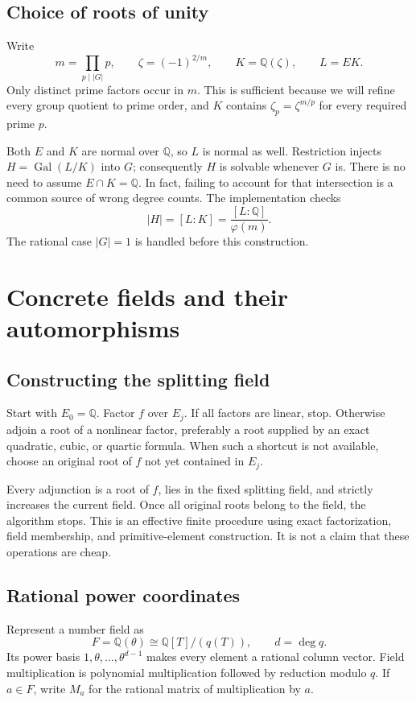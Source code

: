 \documentclass[11pt,a4paper]{article}
\theoremstyle{definition}\newtheorem{definition}[theorem]{Definition}
\theoremstyle{remark}\newtheorem{remark}[theorem]{Remark}
\newcommand{\Q}{\mathbb Q}\newcommand{\C}{\mathbb C}
\newcommand{\Gal}{\operatorname{Gal}}\newcommand{\Aut}{\operatorname{Aut}}
\begin{document}
\subsection{Choice of roots of unity}
Write
\[
 m=\prod_{p\mid |G|}p,\qquad \zeta=(-1)^{2/m},\qquad
 K=\Q(\zeta),\qquad L=EK.
\]
Only distinct prime factors occur in $m$. This is sufficient because we will
refine every group quotient to prime order, and $K$ contains
$\zeta_p=\zeta^{m/p}$ for every required prime $p$.

Both $E$ and $K$ are normal over $\Q$, so $L$ is normal as well. Restriction
injects $H=\Gal(L/K)$ into $G$; consequently $H$ is solvable whenever $G$ is.
There is no need to assume $E\cap K=\Q$. In fact, failing to account for that
intersection is a common source of wrong degree counts. The implementation
checks
\[
 |H|=[L:K]=\frac{[L:\Q]}{\varphi(m)}.
\]
The rational case $|G|=1$ is handled before this construction.

\section{Concrete fields and their automorphisms}
\subsection{Constructing the splitting field}
Start with $E_0=\Q$. Factor $f$ over $E_j$. If all factors are linear, stop.
Otherwise adjoin a root of a nonlinear factor, preferably a root supplied by
an exact quadratic, cubic, or quartic formula. When such a shortcut is not
available, choose an original root of $f$ not yet contained in $E_j$.

Every adjunction is a root of $f$, lies in the fixed splitting field, and
strictly increases the current field. Once all original roots belong to the
field, the algorithm stops. This is an effective finite procedure using
exact factorization, field membership, and primitive-element construction.
It is not a claim that these operations are cheap.

\subsection{Rational power coordinates}
Represent a number field as
\[
 F=\Q(\theta)\cong\Q[T]/(q(T)),\qquad d=\deg q.
\]
Its power basis $1,\theta,\ldots,\theta^{d-1}$ makes every element a rational
column vector. Field multiplication is polynomial multiplication followed by
reduction modulo $q$. If $a\in F$, write $M_a$ for the rational matrix of
multiplication by $a$.
\end{document}
